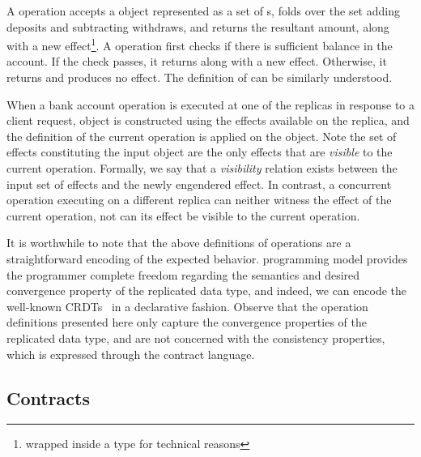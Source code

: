 A  operation accepts a  object
represented as a set of s, folds over the set
adding deposits and subtracting withdraws, and returns the resultant
amount, along with a new  effect\footnote{wrapped
inside a  type for technical reasons}. A 
operation first checks if there is sufficient balance in the account.
If the check passes, it returns  along with a new
 effect. Otherwise, it returns  and produces no
effect. The definition of  can be similarly understood.

When a bank account operation is executed at one of the replicas in
response to a client request,  object is constructed
using the effects available on the replica, and the definition of the
current operation is applied on the object. Note the set of effects
constituting the input  object are the only effects
that are \emph{visible} to the current operation.  Formally, we say
that a \emph{visibility} relation exists between the input set of
effects and the newly engendered effect. In contrast, a concurrent
operation executing on a different replica can neither witness the
effect of the current operation, not can its effect be visible to the
current operation.

It is worthwhile to note that the above definitions of
 operations are a straightforward encoding of the
expected behavior.  \name programming model provides the programmer
complete freedom regarding the semantics and desired convergence
property of the replicated data type, and indeed, we can encode the
well-known CRDTs~\cite{SSS} in a declarative fashion.  Observe that
the operation definitions presented here only capture the convergence
properties of the replicated data type, and are not concerned with the
consistency properties, which is expressed through the contract
language.

\subsection{Contracts}

